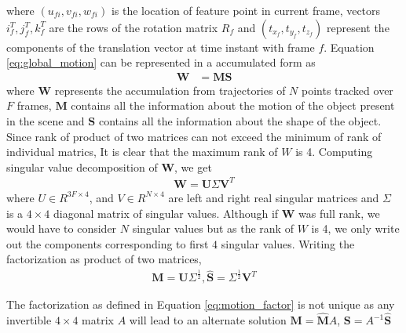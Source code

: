 \documentclass[conference]{IEEEtran}
\begin{document}
where $(u_{fi},v_{fi},w_{fi})$ is the location of feature point in current frame, vectors $i_f^T,j_f^T,k_f^T$ are the rows of the rotation matrix $R_f$ and $(t_{x_f},t_{y_f},t_{z_f})$ represent the components of the translation vector at time instant with frame $f$. Equation \ref{eq:global_motion} can be represented in a accumulated form as 
\begin{align}
\mathbf{W} & = \mathbf{M}\mathbf{S}
\end{align}
where $\mathbf{W}$ represents the accumulation from trajectories of $N$ points tracked over $F$ frames, $\mathbf{M}$ contains all the information about the motion of the object present in the scene and $\mathbf{S}$ contains all the information about the shape of the object. Since rank of product of two matrices can not exceed the minimum of rank of individual matrics, It is clear that the maximum rank of $W$ is 4. Computing singular value decomposition of $\mathbf{W}$, we get 
\begin{align}
\mathbf{W} = \mathbf{U}\Sigma\mathbf{V}^T \label{eq:motion_factor}
\end{align}
where $U \in R^{3F \times 4}$, and $V \in R^{N \times 4}$ are left and right real singular matrices and $\Sigma$ is a $4\times4$ diagonal matrix of singular values. Although if $\mathbf{W}$ was full rank, we would have to consider $N$ singular values but as the rank of $W$ is 4, we only write out the components corresponding to first $4$ singular values. Writing the factorization as product of two matrices,
\begin{align}
\mathbf{\hat{M}} = \mathbf{U}\Sigma^{\frac{1}{2}}, \mathbf{\hat{S}} = \Sigma^{\frac{1}{2}}\mathbf{V}^T \label{eq:motion_factor}
\end{align}

The factorization as defined in Equation \ref{eq:motion_factor} is not unique as any invertible $4 \times 4$ matrix $A$  will lead to an alternate solution $\mathbf{M} = \mathbf{\hat{M}}A$,  $\mathbf{S} = A^{-1}\mathbf{\hat{S}}$
\end{document}
